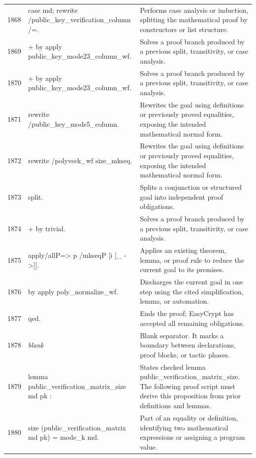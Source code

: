 \documentclass[10pt]{article}
\begin{document}
\begin{longtable}{r L{0.53\textwidth} L{0.37\textwidth}}
1868 & {\ttfamily\scriptsize case md; rewrite /public\_key\_verification\_column /=.} & Performs case analysis or induction, splitting the mathematical proof by constructors or list structure. \\
1869 & {\ttfamily\scriptsize + by apply public\_key\_mode23\_column\_wf.} & Solves a proof branch produced by a previous split, transitivity, or case analysis. \\
1870 & {\ttfamily\scriptsize + by apply public\_key\_mode23\_column\_wf.} & Solves a proof branch produced by a previous split, transitivity, or case analysis. \\
1871 & {\ttfamily\scriptsize rewrite /public\_key\_mode5\_column.} & Rewrites the goal using definitions or previously proved equalities, exposing the intended mathematical normal form. \\
1872 & {\ttfamily\scriptsize rewrite /polyveck\_wf size\_mkseq.} & Rewrites the goal using definitions or previously proved equalities, exposing the intended mathematical normal form. \\
1873 & {\ttfamily\scriptsize split.} & Splits a conjunction or structured goal into independent proof obligations. \\
1874 & {\ttfamily\scriptsize + by trivial.} & Solves a proof branch produced by a previous split, transitivity, or case analysis. \\
1875 & {\ttfamily\scriptsize apply/allP=> p /mkseqP [i [\_ ->]].} & Applies an existing theorem, lemma, or proof rule to reduce the current goal to its premises. \\
1876 & {\ttfamily\scriptsize by apply poly\_normalize\_wf.} & Discharges the current goal in one step using the cited simplification, lemma, or automation. \\
1877 & {\ttfamily\scriptsize qed.} & Ends the proof; EasyCrypt has accepted all remaining obligations. \\
1878 & {\ttfamily\scriptsize \emph{blank}} & Blank separator.  It marks a boundary between declarations, proof blocks, or tactic phases. \\
1879 & {\ttfamily\scriptsize lemma public\_verification\_matrix\_size md pk :} & States checked lemma public\_verification\_matrix\_size.  The following proof script must derive this proposition from prior definitions and lemmas. \\
1880 & {\ttfamily\scriptsize   size (public\_verification\_matrix md pk) = mode\_k md.} & Part of an equality or definition, identifying two mathematical expressions or assigning a program value. \\

\end{longtable}
\end{document}
